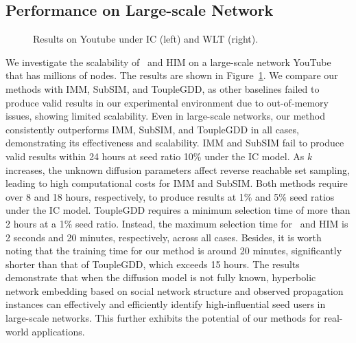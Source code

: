 \subsection{Performance on Large-scale Network}
\begin{figure}[!ht]
\centering
    \caption{Results on Youtube under IC (left) and WLT (right).}
    \label{fig:large}
\end{figure}
We investigate the scalability of \HIMMD~and HIM on a large-scale network YouTube that has millions of nodes.
The results are shown in Figure~\ref{fig:large}.
We compare our methods with IMM, SubSIM, and ToupleGDD, as other baselines failed to produce valid results in our experimental environment due to out-of-memory issues, showing limited scalability.
Even in large-scale networks, our method consistently outperforms IMM, SubSIM, and ToupleGDD in all cases, demonstrating its effectiveness and scalability.
IMM and SubSIM fail to produce valid results within 24 hours at seed ratio 10\% under the IC model.
As $k$ increases, the unknown diffusion parameters affect reverse reachable set sampling, leading to high computational costs for IMM and SubSIM.
Both methods require over 8 and 18 hours, respectively, to produce results at 1\% and 5\% seed ratios under the IC model.
ToupleGDD requires a minimum selection time of more than 2 hours at a 1\% seed ratio.
Instead, the maximum selection time for \HIMMD~and HIM is 2 seconds and 20 minutes, respectively, across all cases.
Besides, it is worth noting that the training time for our method is around 20 minutes, significantly shorter than that of ToupleGDD, which exceeds 15 hours.
The results demonstrate that when the diffusion model is not fully known, hyperbolic network embedding based on social network structure and observed propagation instances can effectively and efficiently identify high-influential seed users in large-scale networks. 
This further exhibits the potential of our methods for real-world applications.


